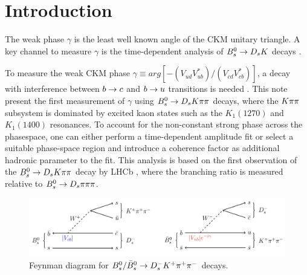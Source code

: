 
\section{Introduction}
\label{sec:Introduction}

The weak phase $\gamma$ is the least well known angle of the CKM unitary triangle. 
A key channel to measure $\gamma$ is the time-dependent analysis of ${{B}^0_{s}}\rightarrow{\ensuremath{{D}_{s}}}{\ensuremath{K}}$ decays \cite{Fleischer:2003yb,DeBruyn:2012jp}. 

To measure the weak CKM phase $\gamma \equiv arg[-(V_{ud}V_{ub}^{*})/(V_{cd}V_{cb}^{*})]$, a decay with interference between ${b}\rightarrow{\ensuremath{c}}$ and ${b}\rightarrow{\ensuremath{u}}$ transitions is needed \cite{Fleischer:2003yb}.
This note present the first measurement of $\gamma$ using ${{B}^0_{s}}\rightarrow{\ensuremath{{D}_{s}}}{\ensuremath{K}}\pi\pi$ decays, where the ${K}{\pi}{\pi}$ subsystem 
is dominated by excited kaon states such as the $K_{1}(1270)$ and $K_{1}(1400)$ resonances.
To account for the non-constant strong phase across the phasespace, 
one can either perform a time-dependent amplitude fit 
or select a suitable phase-space region and introduce a coherence factor as additional hadronic parameter to the fit.
This analysis is based on the first observation of the ${{B}^0_{s}}\rightarrow{\ensuremath{{D}_{s}}}{\ensuremath{K}}{\ensuremath{\pi}}{\ensuremath{\pi}}$ decay by LHCb \cite{Blusk:1471393,Blusk:2012it}, where the branching ratio is measured relative to ${{B}^0_{s}}\rightarrow{\ensuremath{{D}_{s}}}{\ensuremath{\pi}}{\ensuremath{\pi}}{\ensuremath{\pi}}$.


\begin{figure}[h]
\centering
\includegraphics[height=!,width=\textwidth]{figs/feynman.png}
\caption{Feynman diagram for $B_s^0/\bar B_s^0 \rightarrow D_s^- K^+ {{\pi}^+} {{\pi}^-}$ decays.}
\label{fig:decay_feynman}
\end{figure}


